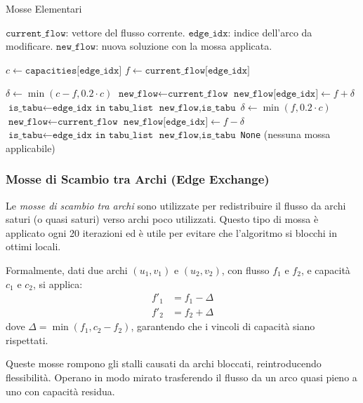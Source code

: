 \documentclass[12pt,a4paper]{article}
\begin{document}
\begin{algorithm}[H]
\caption{Mosse Elementari}
\label{alg:elementary_moves}
\begin{algorithmic}[1]
\REQUIRE $\texttt{current\_flow}$: vettore del flusso corrente.
\REQUIRE $\texttt{edge\_idx}$: indice dell'arco da modificare.
\ENSURE $\texttt{new\_flow}$: nuova soluzione con la mossa applicata.

\STATE $ c \gets \texttt{capacities[edge\_idx]} $
\STATE $ f \gets \texttt{current\_flow[edge\_idx]} $

    \STATE $ \delta \gets \min(c - f, 0.2 \cdot c) $
    \STATE $ \texttt{new\_flow} \gets \texttt{current\_flow} $
    \STATE $ \texttt{new\_flow[edge\_idx]} \gets f + \delta $
    \STATE $ \texttt{is\_tabu} \gets \texttt{edge\_idx in tabu\_list} $
    \RETURN $\texttt{new\_flow}, \texttt{is\_tabu}$
    \STATE $ \delta \gets \min(f, 0.2 \cdot c) $
    \STATE $ \texttt{new\_flow} \gets \texttt{current\_flow} $
    \STATE $ \texttt{new\_flow[edge\_idx]} \gets f - \delta $
    \STATE $ \texttt{is\_tabu} \gets \texttt{edge\_idx in tabu\_list} $
    \RETURN $\texttt{new\_flow}, \texttt{is\_tabu}$
\ENDIF
\RETURN \texttt{None} (nessuna mossa applicabile)
\end{algorithmic}
\end{algorithm}

\subsubsection{Mosse di Scambio tra Archi (Edge Exchange)}

Le \textit{mosse di scambio tra archi} sono utilizzate per redistribuire il flusso da archi saturi (o quasi saturi) verso archi poco utilizzati. Questo tipo di mossa è applicato ogni 20 iterazioni ed è utile per evitare che l’algoritmo si blocchi in ottimi locali.

Formalmente, dati due archi $ (u_1, v_1) $ e $ (u_2, v_2) $, con flusso $ f_1 $ e $ f_2 $, e capacità $ c_1 $ e $ c_2 $, si applica:
\[
\begin{aligned}
f'_1 &= f_1 - \Delta \\
f'_2 &= f_2 + \Delta
\end{aligned}
\]
dove $ \Delta = \min(f_1, c_2 - f_2) $, garantendo che i vincoli di capacità siano rispettati.

Queste mosse rompono gli stalli causati da archi bloccati, reintroducendo flessibilità.
Operano in modo mirato trasferendo il flusso da un arco quasi pieno a uno con capacità residua.
\end{document}
